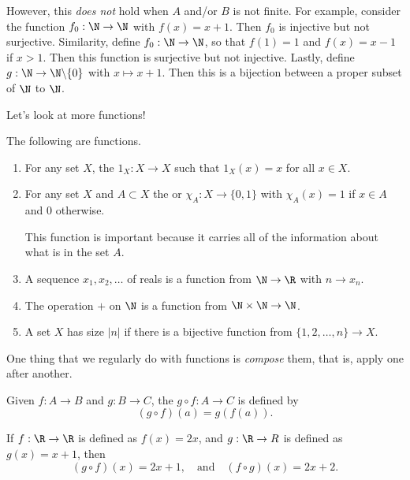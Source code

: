 However, this \emph{does not} hold when $A$ and/or $B$ is not finite. For example, consider the function $f_0: \N \rightarrow \N$ with $f(x) = x + 1$. Then $f_0$ is injective but not surjective.
Similarity, define $f_0 : \N \rightarrow \N$, so that $f(1) = 1$ and $f(x) = x - 1$ if $x > 1$. Then this function is surjective but not injective. Lastly, define $g: \N \rightarrow \N \backslash \{0\}$ with $x \mapsto x + 1$. Then this is a bijection between a proper subset of $\N$ to $\N$.

Let's look at more functions!

\begin{example}
	The following are functions.
	\begin{enumerate}[label=(\roman*)]
		\item For any set $X$, the  $1_X : X  \rightarrow X$ such that $1_X(x) = x$ for all $x \in X$.
		\item For any set $X$ and $A \subset X$ the  or  $\chi_A: X \rightarrow \{0, 1\}$ with $\chi_A(x) = 1$ if $x \in A$ and 0 otherwise.
		
		This function is important because it carries all of the information about what is in the set $A$.
		\item A sequence $x_1, x_2, \dots$ of reals is a function from $\N \rightarrow \R$ with $n \rightarrow x_n$.
		\item The operation $+$ on $\N$ is a function from $\N \times \N \rightarrow \N$.
		\item A set $X$ has size $|n|$ if there is a bijective function from $\{1, 2, \dots, n\} \rightarrow X$.
	\end{enumerate}
\end{example}

One thing that we regularly do with functions is \emph{compose} them, that is, apply one after another.

\begin{definition}
	Given $f : A \rightarrow B$ and $g : B \rightarrow C$, the  $g \circ f : A \rightarrow C$ is defined by
	$$
	(g \circ f)(a) = g(f(a)).
	$$
\end{definition}

\begin{example}
	If $f: \R \rightarrow \R$ is defined as $f(x) = 2x$, and $g: \R \rightarrow R$ is defined as $g(x) = x + 1$, then
	$$
	(g \circ f)(x) = 2x + 1, \quad \text{and}\quad (f \circ g)(x) = 2x + 2.
	$$
\end{example}

